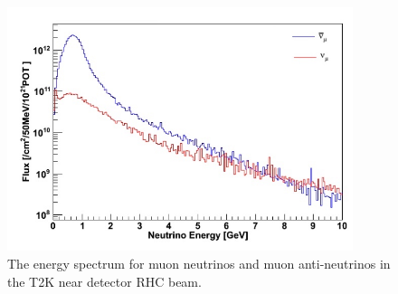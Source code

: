 
\begin{figure}[h!]
\centering
\includegraphics[width=0.9\textwidth]{figures/WAGASCIflux.jpeg}
\caption{The energy spectrum for muon neutrinos and muon anti-neutrinos in the T2K near detector RHC beam.}
\label{fig:T2KndSpectrum}
\end{figure}


